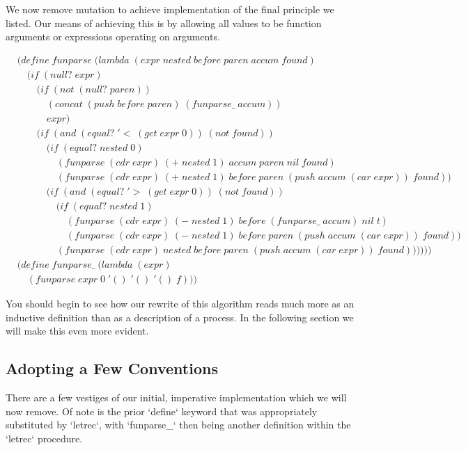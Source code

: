 \documentclass[11pt]{article}
\begin{document}
We now remove mutation to achieve implementation of the final principle we listed. Our means of achieving this is by allowing all values to be function arguments or expressions operating on arguments.

\begin{align*}
& (define \; funparse \; (lambda \; (expr \; nested \; before \; paren \; accum \; found) \; 
\\& \quad (if \; (null? \; expr)
\\& \qquad (if \; (not \; (null? \; paren))
\\& \qquad \quad (concat \; (push \; before \; paren) \; (funparse\_ \; accum))
\\& \qquad \quad expr)
\\& \qquad (if \; (and \; (equal? \; '< \; (get \; expr \; 0)) \; (not \; found))
\\& \qquad \quad (if \; (equal? \; nested \; 0)
\\& \qquad \qquad (funparse \; (cdr \; expr) \; (+ \; nested \; 1) \; accum \; paren \; nil \; found)
\\& \qquad \qquad (funparse \; (cdr \; expr) \; (+ \; nested \; 1) \; before \; paren \; (push \; accum \; (car \; expr)) \; found))
\\& \qquad \quad (if \; (and \; (equal? \; '> \; (get \; expr \; 0)) \; (not \; found))
\\& \qquad \qquad (if \; (equal? \; nested \; 1)
\\& \qquad \qquad \quad (funparse \; (cdr \; expr) \; (- \; nested \; 1) \; before \; (funparse\_ \; accum) \; nil \; t)
\\& \qquad \qquad \quad (funparse \; (cdr \; expr) \; (- \; nested \; 1) \; before \; paren \; (push \; accum \; (car \; expr)) \; found))
\\& \qquad \qquad (funparse \; (cdr \; expr) \; nested \; before \; paren \; (push \; accum \; (car \; expr)) \; found))))))
\\& (define \; funparse\_ \; (lambda \; (expr)
\\& \quad (funparse \; expr \; 0 \; '() \; '() \; '() \; f))) \; 
\end{align*}

You should begin to see how our rewrite of this algorithm reads much more as an inductive definition than as a description of a process. In the following section we will make this even more evident.

\subsection{Adopting a Few Conventions}
There are a few vestiges of our initial, imperative implementation which we will now remove. Of note is the prior `define` keyword that was appropriately substituted by `letrec`, with `funparse\_` then being another definition within the `letrec` procedure.
\end{document}
